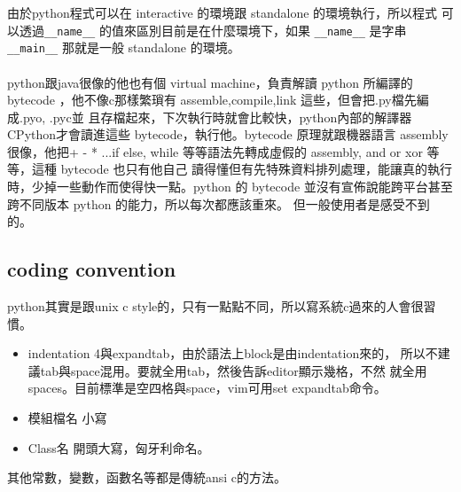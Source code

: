 由於python程式可以在 interactive 的環境跟 standalone 的環境執行，所以程式
可以透過\verb=__name__= 的值來區別目前是在什麼環境下，如果 \verb=__name__=
是字串 \verb=__main__= 那就是一般 standalone 的環境。
\\\\
python跟java很像的他也有個 virtual machine，負責解讀 python 所編譯的 bytecode
，他不像c那樣繁瑣有 assemble,compile,link 這些，但會把.py檔先編成.pyo, .pyc並
且存檔起來，下次執行時就會比較快，python內部的解譯器CPython才會讀進這些
bytecode，執行他。bytecode 原理就跟機器語言 assembly 很像，他把+ - * ...if else, 
while 等等語法先轉成虛假的 assembly, and or xor 等等，這種 bytecode 也只有他自己
讀得懂但有先特殊資料排列處理，能讓真的執行時，少掉一些動作而使得快一點。python
的 bytecode 並沒有宣佈說能跨平台甚至跨不同版本 python 的能力，所以每次都應該重來。
但一般使用者是感受不到的。

\subsection{coding convention}
python其實是跟unix c style的，只有一點點不同，所以寫系統c過來的人會很習慣。
\begin{itemize}
  \item indentation 4與expandtab，由於語法上block是由indentation來的，
        所以不建議tab與space混用。要就全用tab，然後告訴editor顯示幾格，不然
        就全用spaces。目前標準是空四格與space，vim可用set expandtab命令。
  \item 模組檔名 小寫
  \item Class名 開頭大寫，匈牙利命名。
\end{itemize}
其他常數，變數，函數名等都是傳統ansi c的方法。

